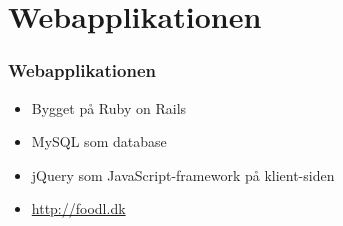\section{Webapplikationen}
\begin{frame}
  \frametitle{Webapplikationen}
  \begin{itemize}
    \item Bygget på Ruby on Rails
    \item MySQL som database
    \item jQuery som JavaScript-framework på klient-siden
    \item \url{http://foodl.dk}
  \end{itemize}
\end{frame}
